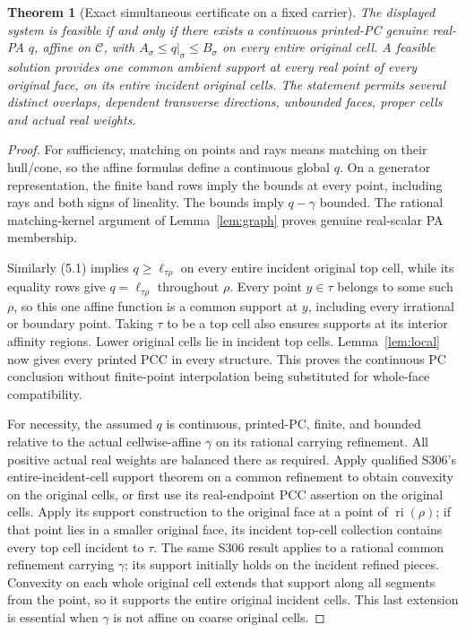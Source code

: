 \documentclass[11pt]{article}
\newtheorem{theorem}{Theorem}[section]
\newcommand{\ri}{\operatorname{ri}}
\begin{document}
\begin{theorem}[Exact simultaneous certificate on a fixed carrier]\label{thm:certificate}
The displayed system is feasible if and only if there exists a continuous printed-PC genuine real-PA $q$, affine on $\mathcal C$, with $A_\sigma\leq q|_\sigma\leq B_\sigma$ on every entire original cell. A feasible solution provides one common ambient support at every real point of every original face, on its entire incident original cells. The statement permits several distinct overlaps, dependent transverse directions, unbounded faces, proper cells and actual real weights.
\end{theorem}
\begin{proof}
For sufficiency, matching on points and rays means matching on their hull/cone, so the affine formulas define a continuous global $q$. On a generator representation, the finite band rows imply the bounds at every point, including rays and both signs of lineality. The bounds imply $q-\gamma$ bounded. The rational matching-kernel argument of Lemma~\ref{lem:graph} proves genuine real-scalar PA membership.

Similarly (5.1) implies $q\geq\ell_{\tau\rho}$ on every entire incident original top cell, while its equality rows give $q=\ell_{\tau\rho}$ throughout $\rho$. Every point $y\in\tau$ belongs to some such $\rho$, so this one affine function is a common support at $y$, including every irrational or boundary point. Taking $\tau$ to be a top cell also ensures supports at its interior affinity regions. Lower original cells lie in incident top cells. Lemma~\ref{lem:local} now gives every printed PCC in every structure. This proves the continuous PC conclusion without finite-point interpolation being substituted for whole-face compatibility.

For necessity, the assumed $q$ is continuous, printed-PC, finite, and bounded relative to the actual cellwise-affine $\gamma$ on its rational carrying refinement. All positive actual real weights are balanced there as required. Apply qualified S306's entire-incident-cell support theorem on a common refinement to obtain convexity on the original cells, or first use its real-endpoint PCC assertion on the original cells. Apply its support construction to the original face at a point of $\ri(\rho)$; if that point lies in a smaller original face, its incident top-cell collection contains every top cell incident to $\tau$. The same S306 result applies to a rational common refinement carrying $\gamma$; its support initially holds on the incident refined pieces. Convexity on each whole original cell extends that support along all segments from the point, so it supports the entire original incident cells. This last extension is essential when $\gamma$ is not affine on coarse original cells.


\end{proof}
\end{document}

